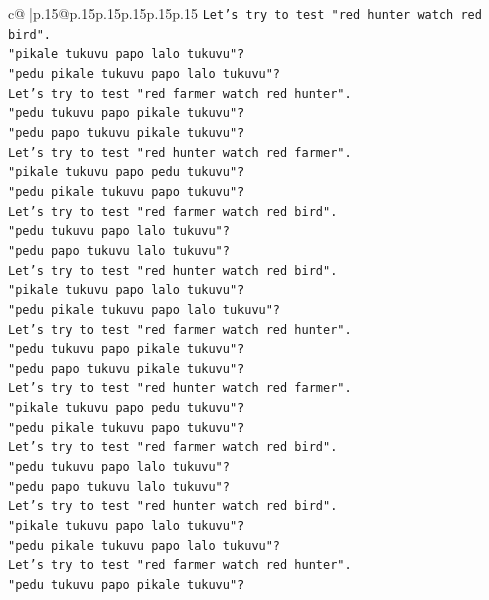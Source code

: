 \documentclass{article}
\begin{document}
{\begin{supertabular}{c@{$\;$}|p{.15\linewidth}@{}p{.15\linewidth}p{.15\linewidth}p{.15\linewidth}p{.15\linewidth}p{.15\linewidth}}
{{{\texttt{Let's try to test "red hunter watch red bird".} \\
\texttt{"pikale tukuvu papo lalo tukuvu"?} \\
\texttt{"pedu pikale tukuvu papo lalo tukuvu"?} \\
\texttt{Let's try to test "red farmer watch red hunter".} \\
\texttt{"pedu tukuvu papo pikale tukuvu"?} \\
\texttt{"pedu papo tukuvu pikale tukuvu"?} \\
\texttt{Let's try to test "red hunter watch red farmer".} \\
\texttt{"pikale tukuvu papo pedu tukuvu"?} \\
\texttt{"pedu pikale tukuvu papo tukuvu"?} \\
\texttt{Let's try to test "red farmer watch red bird".} \\
\texttt{"pedu tukuvu papo lalo tukuvu"?} \\
\texttt{"pedu papo tukuvu lalo tukuvu"?} \\
\texttt{Let's try to test "red hunter watch red bird".} \\
\texttt{"pikale tukuvu papo lalo tukuvu"?} \\
\texttt{"pedu pikale tukuvu papo lalo tukuvu"?} \\
\texttt{Let's try to test "red farmer watch red hunter".} \\
\texttt{"pedu tukuvu papo pikale tukuvu"?} \\
\texttt{"pedu papo tukuvu pikale tukuvu"?} \\
\texttt{Let's try to test "red hunter watch red farmer".} \\
\texttt{"pikale tukuvu papo pedu tukuvu"?} \\
\texttt{"pedu pikale tukuvu papo tukuvu"?} \\
\texttt{Let's try to test "red farmer watch red bird".} \\
\texttt{"pedu tukuvu papo lalo tukuvu"?} \\
\texttt{"pedu papo tukuvu lalo tukuvu"?} \\
\texttt{Let's try to test "red hunter watch red bird".} \\
\texttt{"pikale tukuvu papo lalo tukuvu"?} \\
\texttt{"pedu pikale tukuvu papo lalo tukuvu"?} \\
\texttt{Let's try to test "red farmer watch red hunter".} \\
\texttt{"pedu tukuvu papo pikale tukuvu"?} \\
}}}
\end{supertabular}}
\end{document}
